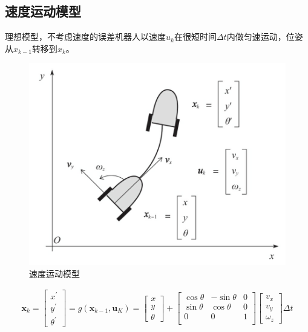\documentclass[10pt]{article}
\begin{document}
\subsection{速度运动模型}
理想模型，不考虑速度的误差机器人以速度$u_k$在很短时间$\Delta t$内做匀速运动，位姿从$x_{k-1}$转移到$x_k$。
\begin{figure}[!htb]
    \includegraphics[width=\hsize]{images/速度运动模型.png}
    \caption{速度运动模型}
\end{figure}
\begin{align}  
    \mathbf{x}_{k}=\left[\begin{array}{c}x^{'} \\ y^{'} \\ \theta^{'} \end{array}\right]=
    g(\mathbf{x}_{k-1},\mathbf{u}_{K}) = \left[\begin{array}{c} x \\ y \\ \theta\end{array}\right]
    +\left[\begin{array}{ccc} \cos{\theta} & -\sin{\theta} & 0 \\ \sin{\theta} & \cos{\theta}
    & 0 \\ 0 & 0 & 1 \\ \end{array}\right] \left[\begin{array}{c}v_x \\ v_y \\ \omega_{z} 
    \end{array}\right] \Delta t
\end{align}
\end{document}
